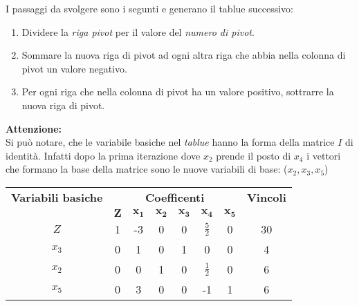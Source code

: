 \documentclass{article}
\begin{document}
I passaggi da svolgere sono i segunti e generano il tablue successivo:
\begin{enumerate}
  \item Dividere la \textit{riga pivot} per il valore del \textit{numero di pivot}.
  \item Sommare la nuova riga di pivot ad ogni altra riga che abbia nella colonna di pivot un valore negativo.
  \item Per ogni riga che nella colonna di pivot ha un valore positivo, sottrarre la nuova riga di pivot.
\end{enumerate}
\begin{tcolorbox}[breakable]
  \textbf{Attenzione:} \\
  Si può notare, che le variabile basiche nel \textit{tablue} hanno la forma della matrice $I$ di identità. Infatti dopo la prima iterazione dove $x_2$ prende il posto di $x_4$ i vettori che formano la base della matrice sono le nuove variabili di base: ($x_2, x_3, x_5$)
\end{tcolorbox}

\begin{table}[h]
  \centering
  \begin{tabular}{|c|c|c|c|c|c|c|c|}
    \hline
    {\textbf{Variabili basiche}} & \multicolumn{6}{|c|}{\textbf{Coefficenti}} & \textbf{Vincoli}                                                                          \\
    \cline{1-8}
                                 & $\mathbf{Z}$                               & $\mathbf{x_1}$   & $\mathbf{x_2}$ & $\mathbf{x_3}$ & $\mathbf{x_4}$ & $\mathbf{x_5}$ &    \\
    \hline
    $Z$                          & 1                                          & -3               & 0              & 0              & $\frac{5}{2}$  & 0              & 30 \\
    $x_3$                        & 0                                          & 1                & 0              & 1              & 0              & 0              & 4  \\
    $x_2$                        & 0                                          & 0                & 1              & 0              & $\frac{1}{2}$  & 0              & 6  \\
    $x_5$                        & 0                                          & 3                & 0              & 0              & -1             & 1              & 6  \\
    \hline
  \end{tabular}
\end{table}
\end{document}

